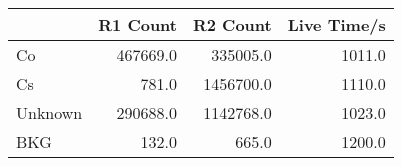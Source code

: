 \begin{tabular}{lrrr}
\toprule
{} &  R1 Count &   R2 Count &  Live Time/s \\
\midrule
Co      &  467669.0 &   335005.0 &       1011.0 \\
Cs      &     781.0 &  1456700.0 &       1110.0 \\
Unknown &  290688.0 &  1142768.0 &       1023.0 \\
BKG     &     132.0 &      665.0 &       1200.0 \\
\bottomrule
\end{tabular}
